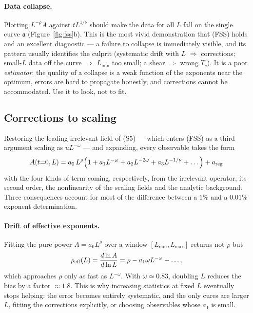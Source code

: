 \documentclass[10pt,a4paper]{article}
\theoremstyle{remark}
\begin{document}
\paragraph{Data collapse.} Plotting $L^{-\rho}A$ against $tL^{1/\nu}$ should make
the data for all $L$ fall on the single curve $\mathfrak{a}$
(Figure~\ref{fig:fss}b). This is the most vivid demonstration that (FSS) holds
and an excellent diagnostic --- a failure to collapse is immediately visible, and
its pattern usually identifies the culprit (systematic drift with $L$
$\Rightarrow$ corrections; small-$L$ data off the curve $\Rightarrow$ $L_{\min}$
too small; a shear $\Rightarrow$ wrong $T_c$). It is a poor \emph{estimator}: the
quality of a collapse is a weak function of the exponents near the optimum,
errors are hard to propagate honestly, and corrections cannot be accommodated.
Use it to look, not to fit.

\subsection{Corrections to scaling}
\label{sec:fss:corrections}

Restoring the leading irrelevant field of (S5) --- which enters (FSS) as a third
argument scaling as $uL^{-\omega}$ --- and expanding, every observable takes the
form
\[
\;
A(t{=}0,L)=a_0\,L^{\rho}\Big(1+a_1L^{-\omega}+a_2L^{-2\omega}
+a_3L^{-1/\nu}+\dots\Big)+a_{\rm reg}
\
\]
with the four kinds of term coming, respectively, from the irrelevant operator,
its second order, the nonlinearity of the scaling fields and the analytic
background. Three consequences account for most of the difference between a
$1\%$ and a $0.01\%$ exponent determination.

\paragraph{Drift of effective exponents.} Fitting the pure power $A=a_0L^{\rho}$
over a window $[L_{\min},L_{\max}]$ returns not $\rho$ but
\[
\rho_{\rm eff}(L)=\frac{d\ln A}{d\ln L}=\rho-a_1\omega L^{-\omega}+\dots ,
\]
which approaches $\rho$ only as fast as $L^{-\omega}$. With $\omega\simeq0.83$,
doubling $L$ reduces the bias by a factor $\approx1.8$. This is why increasing
statistics at fixed $L$ eventually stops helping: the error becomes entirely
systematic, and the only cures are larger $L$, fitting the corrections
explicitly, or choosing observables whose $a_1$ is small.
\end{document}
